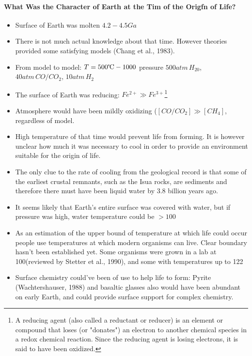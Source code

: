 \documentclass[12pt]{paper}
\begin{document}
\paragraph{What Was the Character of Earth at the Tim
of the Origfn of Life?}

\begin{itemize}
 \item Surface of Earth was molten $4.2-4.5Ga$
 \item There is not much actual knowledge about that time. However theories provided some 
satisfying models (Chang et al., 1983). 
\item From model to model:
  \subitem \textopenbullet $T=500\mbox{\textcelsius}-1000$\textcelsius
  \subitem \textopenbullet pressure $500 atm\,H_20$, $40 atm\,CO/CO_2$, $10atm\,H_2$
\item The surface of Earth was reducing: $Fe^{2+}\gg Fe^{3+}$\footnote{A reducing agent (also 
called a reductant or reducer) is an element or compound that loses (or "donates") an electron to 
another chemical species in a redox chemical reaction. Since the reducing agent is losing 
electrons, it is said to have been oxidized.}
\item  Atmosphere would have been mildly oxidizing ($[CO/CO_2] \gg [CH_4]$, regardless of model.
\item High temperature of that time would prevent life from forming.  It is however unclear how 
much it was necessary to
cool in order to provide an environment suitable for the
origin of life. 
 \item  The only clue to the rate of cooling from
the geological record is that some of the earliest crustal
remnants, such as the Isua rocks, are sediments and
therefore there must have been liquid water by 3.8 billion
years ago.
\item  It seems likely that Earth’s entire surface was covered with water, but if pressure was 
high, water temperature could be $>100$\textcelsius
\item As an estimation of the upper bound of temperature at which life could occur people use 
temperatures at which modern organisms can live. Clear boundary hasn't been established yet. Some 
organisms were grown in a lab at 100\textcelsius (reviewed by Stetter et al., 
1990), and some with temperatures up to 122\textcelsius \cite{Takai2008} 
\item Surface chemistry could've been of use to help life to form:  Pyrite (Wachtershauser, 1988) 
and basaltic glasses also would have been
abundant on early Earth, and could provide surface support for complex chemistry. 
\end{itemize}

 


   
   
\end{document}
